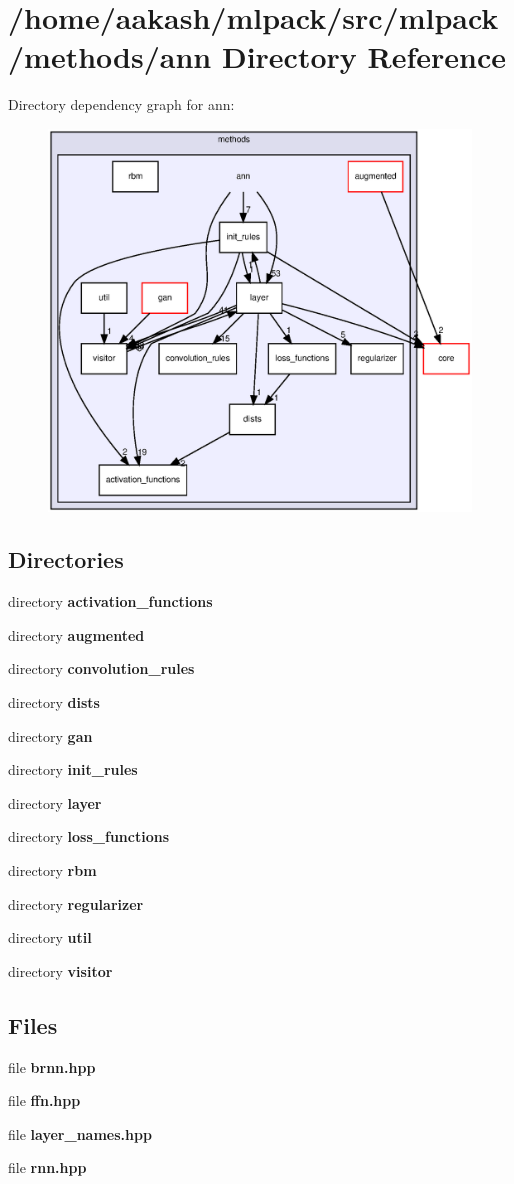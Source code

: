 \section{/home/aakash/mlpack/src/mlpack/methods/ann Directory Reference}
\label{dir_04cdefcc9a97fb221ee3f2d7fb8aab76}
Directory dependency graph for ann\+:
\nopagebreak
\begin{figure}[H]
\begin{center}
\leavevmode
\includegraphics[width=350pt]{dir_04cdefcc9a97fb221ee3f2d7fb8aab76_dep}
\end{center}
\end{figure}
\subsection*{Directories}
\begin{DoxyCompactItemize}
\item 
directory \textbf{ activation\+\_\+functions}
\item 
directory \textbf{ augmented}
\item 
directory \textbf{ convolution\+\_\+rules}
\item 
directory \textbf{ dists}
\item 
directory \textbf{ gan}
\item 
directory \textbf{ init\+\_\+rules}
\item 
directory \textbf{ layer}
\item 
directory \textbf{ loss\+\_\+functions}
\item 
directory \textbf{ rbm}
\item 
directory \textbf{ regularizer}
\item 
directory \textbf{ util}
\item 
directory \textbf{ visitor}
\end{DoxyCompactItemize}
\subsection*{Files}
\begin{DoxyCompactItemize}
\item 
file \textbf{ brnn.\+hpp}
\item 
file \textbf{ ffn.\+hpp}
\item 
file \textbf{ layer\+\_\+names.\+hpp}
\item 
file \textbf{ rnn.\+hpp}
\end{DoxyCompactItemize}
